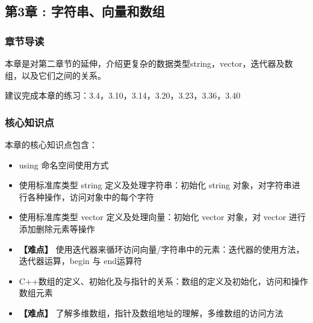\documentclass[11pt]{article}
\begin{document}
\subsection{第3章 : 字符串、向量和数组}
\label{sec:orgheadline15}

\subsubsection{章节导读}
\label{sec:orgheadline13}

本章是对第二章节的延伸，介绍更复杂的数据类型string，vector，迭代器及数组，以及它们之间的关系。

建议完成本章的练习：3.4，3.10，3.14，3.20，3.23，3.36，3.40

\subsubsection{核心知识点}
\label{sec:orgheadline14}

本章的核心知识点包含：

\begin{itemize}
\item using 命名空间使用方式
\item 使用标准库类型 string 定义及处理字符串：初始化 string 对象，对字符串进行各种操作，访问对象中的每个字符
\item 使用标准库类型 vector 定义及处理向量：初始化 vector 对象，对 vector 进行添加删除元素等操作
\item \textbf{【难点】} 使用迭代器来循环访问向量/字符串中的元素：迭代器的使用方法，迭代器运算，begin 与 end运算符
\item C++数组的定义、初始化及与指针的关系：数组的定义及初始化，访问和操作数组元素
\item \textbf{【难点】} 了解多维数组，指针及数组地址的理解，多维数组的访问方法
\end{itemize}
\end{document}
